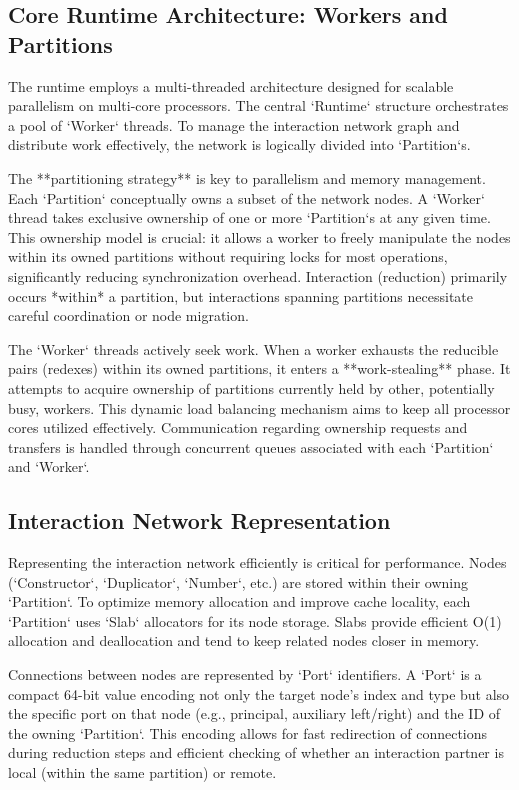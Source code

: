 \subsection{Core Runtime Architecture: Workers and Partitions} %
The runtime employs a multi-threaded architecture designed for scalable parallelism on multi-core processors. The central `Runtime` structure orchestrates a pool of `Worker` threads. To manage the interaction network graph and distribute work effectively, the network is logically divided into `Partition`s.

The **partitioning strategy** is key to parallelism and memory management. Each `Partition` conceptually owns a subset of the network nodes. A `Worker` thread takes exclusive ownership of one or more `Partition`s at any given time. This ownership model is crucial: it allows a worker to freely manipulate the nodes within its owned partitions without requiring locks for most operations, significantly reducing synchronization overhead. Interaction (reduction) primarily occurs *within* a partition, but interactions spanning partitions necessitate careful coordination or node migration.

The `Worker` threads actively seek work. When a worker exhausts the reducible pairs (redexes) within its owned partitions, it enters a **work-stealing** phase. It attempts to acquire ownership of partitions currently held by other, potentially busy, workers. This dynamic load balancing mechanism aims to keep all processor cores utilized effectively. Communication regarding ownership requests and transfers is handled through concurrent queues associated with each `Partition` and `Worker`.

\subsection{Interaction Network Representation} %
Representing the interaction network efficiently is critical for performance. Nodes (`Constructor`, `Duplicator`, `Number`, etc.) are stored within their owning `Partition`. To optimize memory allocation and improve cache locality, each `Partition` uses `Slab` allocators for its node storage. Slabs provide efficient O(1) allocation and deallocation and tend to keep related nodes closer in memory.

Connections between nodes are represented by `Port` identifiers. A `Port` is a compact 64-bit value encoding not only the target node's index and type but also the specific port on that node (e.g., principal, auxiliary left/right) and the ID of the owning `Partition`. This encoding allows for fast redirection of connections during reduction steps and efficient checking of whether an interaction partner is local (within the same partition) or remote.

